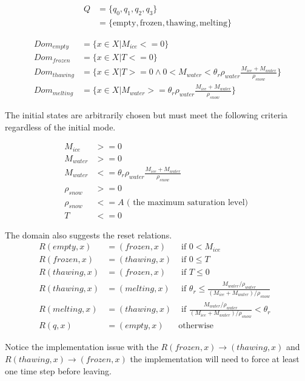 \documentclass{article}
\begin{document}
\begin{align}
Q &= \{q_0, q_1, q_2, q_3\} \\
  &= \{\text{empty}, \text{frozen}, \text{thawing}, \text{melting}\}
\end{align}

\begin{align}
Dom_{empty} &= \{x \in X \big| M_{ice} <= 0\} \\
Dom_{frozen} &= \{x \in X \big| T <= 0\} \\
Dom_{thawing} &= \{x \in X \big| T >= 0 
    \wedge 0 < M_{water} <
    \theta_{r} \rho_{water} \frac{M_{ice} + M_{water}}{\rho_{snow}}\} \\
Dom_{melting} &= \{x \in X \big|  M_{water} >=
    \theta_{r} \rho_{water} \frac{M_{ice} + M_{water}}{\rho_{snow}}\}
\end{align}

The initial states are arbitrarily chosen but must meet 
the following criteria regardless of the initial mode.

\begin{align}
M_{ice} &>= 0 \\
M_{water} &>= 0 \\
M_{water} &<= \theta_{r} \rho_{water} \frac{M_{ice} + M_{water}}{\rho_{snow}} \\
\rho_{snow} &>= 0 \\
\rho_{snow} &<= A \text{ ( the maximum saturation level) } \\
T &<= 0
\end{align}

The domain also suggests the reset relations.
\begin{align}
R(empty,x) &= (frozen, x)  & \textrm{  if $0 < M_{ice}$ } \\
R(frozen,x) &= (thawing,x) & \textrm{  if $0 \le T$ } \\
R(thawing,x) &= (frozen,x) & \textrm{  if $T \le 0$ } \\ 
R(thawing,x) &= (melting,x) & \textrm{  if 
   $\theta_{r} \le \frac{M_{water} / \rho_{water} }
        {(M_{ice} + M_{water}) / \rho_{snow}}$  } \\
R(melting,x) &= (thawing,x) & \textrm{  if 
      $\frac{M_{water} / \rho_{water} }
        {(M_{ice} + M_{water}) / \rho_{snow}} < \theta_{r}$  } \\ 
R(q,x) &= (empty, x) & \textrm{otherwise}
\end{align}

Notice the implementation issue with the $R(frozen,x) \to (thawing,x)$ and
$R(thawing,x) \to (frozen,x)$ the implementation will need to
force at least one time step before leaving.
\end{document}
